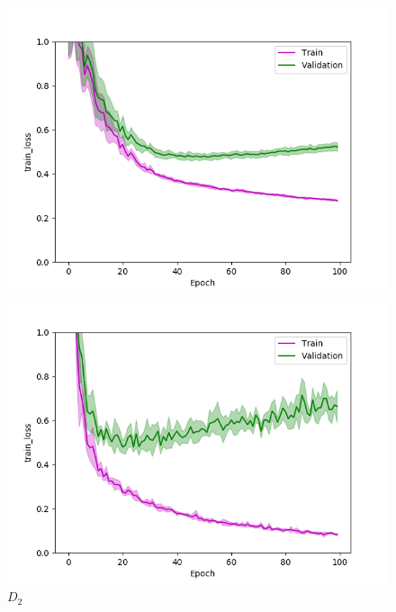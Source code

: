 \def\year{2017}\relax \documentclass[letterpaper]{article}
\begin{document}
\begin{figure}
\centering
\begin{minipage}{.24\textwidth}
  \centering
\includegraphics[width=\textwidth]{pics/d1_train_loss_mean_train_test.png}
\caption{$D_1$}\label{fig:d1lossraintest}
\end{minipage}
\begin{minipage}{.01\textwidth}
\end{minipage}
\begin{minipage}{.24\textwidth}
  \centering
\includegraphics[width=\textwidth]{pics/d2_train_loss_mean_train_test.png}
\caption{$D_2$}\label{fig:d2losstraintest}
\end{minipage}

\end{figure}
\end{document}
